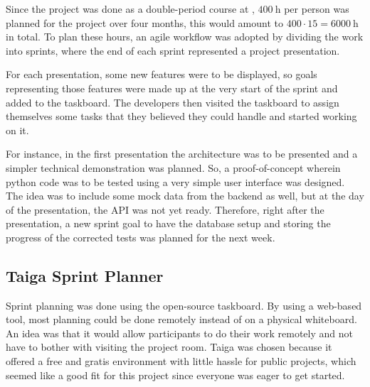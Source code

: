 Since the project was done as a double-period course at \LTU, $\SI{400}{\hour}$ per person was planned for the project over four months, this would amount to $400\cdot15=\SI{6000}{\hour}$ in total. To plan these hours, an agile workflow was adopted by dividing the work into sprints, where the end of each sprint represented a project presentation.

For each presentation, some new features were to be displayed, so goals representing those features were made up at the very start of the sprint and added to the taskboard. The developers then visited the taskboard to assign themselves some tasks that they believed they could handle and started working on it.

For instance, in the first presentation the architecture was to be presented and a simpler technical demonstration was planned. So, a proof-of-concept wherein python code was to be tested using a very simple user interface was designed. The idea was to include some mock data from the backend as well, but at the day of the presentation, the API was not yet ready. Therefore, right after the presentation, a new sprint goal to have the database setup and storing the progress of the corrected tests was planned for the next week.

\subsection{Taiga Sprint Planner}
Sprint planning was done using the open-source \taiga{} taskboard. By using a web-based tool, most planning could be done remotely instead of on a physical whiteboard. An idea was that it would allow participants to do their work remotely and not have to bother with visiting the project room. Taiga was chosen because it offered a free and gratis environment with little hassle for public projects, which seemed like a good fit for this project since everyone was eager to get started.

